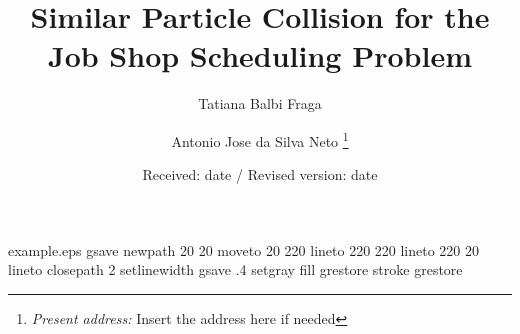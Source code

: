 %
%
%
%
\begin{filecontents*}{example.eps}
gsave
newpath
  20 20 moveto
  20 220 lineto
  220 220 lineto
  220 20 lineto
closepath
2 setlinewidth
gsave
  .4 setgray fill
grestore
stroke
grestore
\end{filecontents*}
%
\documentclass[global,referee]{svjour}
%
\usepackage{graphics}
%
%

%
\title{Similar Particle Collision for the Job Shop Scheduling Problem}
\author{Tatiana Balbi Fraga \and Antonio Jose da Silva Neto%
\thanks{\emph{Present address:} Insert the address here if needed}%
}                     %
%
\offprints{}          %
%
%
\date{Received: date / Revised version: date}
%
\maketitle
%
\begin{abstract}
In this paper we present the Similar Particle Collision heuristic (SPC) and the Similar Particle Multicollision algorithm with Exploration by Tabu Search, specially developed to solve the Job Shop Scheduling Problem. Although there is a wide range of heuristics and algorithms developed to solve this famous problem, the SPC has an interesting characteristic, since its application is not very sensitive to the adjustment of the parameters used. Another important characteristic is that the presented heuristic allows the successful hybridization of different algorithms mixing aspects of local and global exploration. As we can see, the results are as good as the best results presented in the literature and the method attenuates the different results found by adjusting the parameters, leading to a more robust search.
\end{abstract}
%
